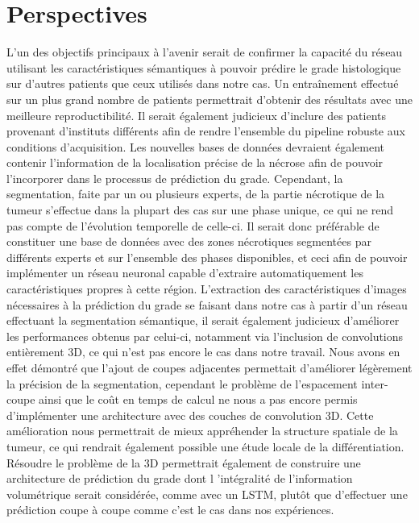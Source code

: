\documentclass[]{memoir}
\begin{document}
\section{Perspectives}
L’un des objectifs principaux à l’avenir serait de confirmer la capacité du réseau utilisant les caractéristiques sémantiques à pouvoir prédire le grade histologique sur d’autres patients que ceux utilisés dans notre cas. 
Un entraînement effectué sur un plus grand nombre de patients permettrait d’obtenir des résultats avec une meilleure reproductibilité. Il serait également judicieux d’inclure des patients provenant d’instituts différents afin de rendre l’ensemble du pipeline robuste aux conditions d’acquisition. Les nouvelles bases de données devraient également contenir l’information de la localisation précise de la nécrose afin de pouvoir l’incorporer dans le processus de prédiction du grade. Cependant, la segmentation, faite par un ou plusieurs experts, de la partie nécrotique de la tumeur s’effectue dans la plupart des cas sur une phase unique, ce qui ne rend pas compte de l’évolution temporelle de celle-ci. Il serait donc préférable de constituer une base de données avec des zones nécrotiques segmentées par différents experts et sur l’ensemble des phases disponibles, et ceci afin de pouvoir implémenter un réseau neuronal capable d’extraire automatiquement les caractéristiques propres à cette région. 
L’extraction des caractéristiques d’images nécessaires à la prédiction du grade se faisant dans notre cas à partir d’un réseau effectuant la segmentation sémantique, il serait également judicieux d’améliorer les performances obtenus par celui-ci, notamment via l’inclusion de convolutions entièrement 3D, ce qui n’est pas encore le cas dans notre travail. Nous avons en effet démontré que l’ajout de coupes adjacentes permettait d’améliorer légèrement la précision de la segmentation, cependant le problème de l’espacement inter-coupe ainsi que le coût en temps de calcul ne nous a pas encore permis d’implémenter une architecture avec des couches de convolution 3D. Cette amélioration nous permettrait de mieux appréhender la structure spatiale de la tumeur, ce qui rendrait également possible une étude locale de la différentiation. Résoudre le problème de la 3D permettrait également de construire une architecture de prédiction du grade dont l 'intégralité de l’information volumétrique serait considérée, comme avec un LSTM, plutôt que d’effectuer une prédiction coupe à coupe comme c’est le cas dans nos expériences.
\end{document}
